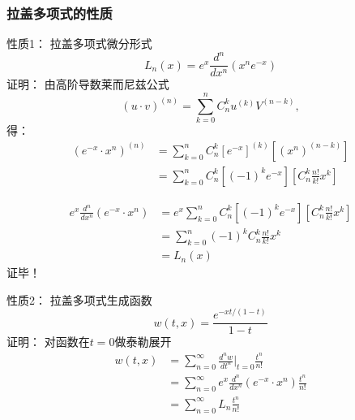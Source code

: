 \begin{frame}
	\frametitle{拉盖多项式的性质}
	\alert{	性质1：}  拉盖多项式微分形式
	\begin{equation*}
		L_n(x) =e^x \frac{d ^n}{d x^n} (x^n e^{-x})
	\end{equation*}	
	\alert{	证明：}  由高阶导数莱而尼兹公式 
	\begin{equation*}
		(u\cdot v) ^{(n)} =\sum_{k=0}^{n} C^k _n u^{(k) }V^{(n-k)}, 
	\end{equation*}	
	得：
	\begin{equation*}
	\begin{split}
		(e^{-x}\cdot x^n) ^{(n)}&= \sum_{k=0}^{n} C^k _n [ e ^{-x}]^{(k)}   [(x^n)^{(n-k)}]\\
		&= \sum_{k=0}^{n} C^k _n [(-1)^k e ^{-x}]   [C^k _n  \frac{n!}{k!} x^k]
	\end{split}		
	\end{equation*}	
\end{frame}		

\begin{frame}
	\begin{equation*}
	\begin{split}
		e^x \frac{d^n }{d x^n} (e^{-x}\cdot x^n) &=e^x \sum_{k=0}^{n} C^k _n [(-1)^k e ^{-x}]   [C^k _n  \frac{n!}{k!}  x^k]\\
		&= \sum_{k=0}^{n} (-1)^k C^k _n \frac{n!}{k!}x^k  \\
		&=L_n (x)		
	\end{split}		
	\end{equation*}	
	\alert{	证毕！}
\end{frame}		

\begin{frame}
	\alert{	性质2：}  拉盖多项式生成函数
	\begin{equation*}
		w(t,x) =\frac{e^{-xt/(1-t) } } {1-t}
	\end{equation*}	
	\alert{	证明：}  对函数在$t=0$做泰勒展开
	\begin{equation*}
	\begin{split}
		w(t,x) &= \sum_{n=0}^{\infty} \frac{d^n w}{d t^n} |_{t=0} \frac{t^n}{n!}   \\
		&= \sum_{n=0}^{\infty}  e^x \frac{d^n }{d x^n} (e^{-x}\cdot x^n) \frac{t^n}{n!}\\
		&= \sum_{n=0}^{\infty}  L_n  \frac{t^n}{n!}
	\end{split}		
	\end{equation*}	
\end{frame}		

